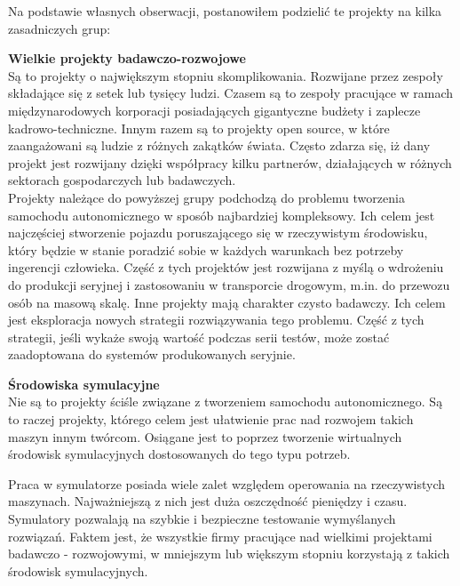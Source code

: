 Na podstawie własnych obserwacji, postanowiłem podzielić te projekty na kilka zasadniczych grup:

\begin{enumerate*}
\item \textbf{Wielkie projekty badawczo-rozwojowe} \\
Są to projekty o największym stopniu skomplikowania. Rozwijane przez zespoły składające się z setek lub tysięcy ludzi. Czasem są to zespoły pracujące w ramach międzynarodowych korporacji posiadających gigantyczne budżety i zaplecze kadrowo-techniczne. Innym razem są to projekty open source, w które zaangażowani są ludzie z różnych zakątków świata. Często zdarza się, iż dany projekt jest rozwijany dzięki współpracy kilku partnerów, działających w różnych sektorach gospodarczych lub badawczych. \\
Projekty należące do powyższej grupy podchodzą do problemu tworzenia samochodu autonomicznego w sposób najbardziej kompleksowy. Ich celem jest najczęściej stworzenie pojazdu poruszającego się w rzeczywistym środowisku, który będzie w stanie poradzić sobie w każdych warunkach bez potrzeby ingerencji człowieka.
Część z tych projektów jest rozwijana z myślą o wdrożeniu do produkcji seryjnej i zastosowaniu w transporcie drogowym, m.in. do przewozu osób na masową skalę.
Inne projekty mają charakter czysto badawczy. Ich celem jest eksploracja nowych strategii rozwiązywania tego problemu. Część z tych strategii, jeśli wykaże swoją wartość podczas serii testów, może zostać zaadoptowana do systemów produkowanych seryjnie. \\

\item \textbf{Środowiska symulacyjne} \\
Nie są to projekty ściśle związane z tworzeniem samochodu autonomicznego. Są to raczej projekty, którego celem jest ułatwienie prac nad rozwojem takich maszyn innym twórcom. Osiągane jest to poprzez tworzenie wirtualnych środowisk symulacyjnych dostosowanych do tego typu potrzeb. 

\hspace{0.5cm} Praca w symulatorze posiada wiele zalet względem operowania na rzeczywistych maszynach. Najważniejszą z nich jest duża oszczędność pieniędzy i czasu. Symulatory pozwalają na szybkie i bezpieczne testowanie wymyślanych rozwiązań. \linebreak
Faktem jest, że wszystkie firmy pracujące nad wielkimi projektami badawczo - rozwojowymi, w mniejszym lub większym stopniu korzystają z takich środowisk symulacyjnych. \\


\end{enumerate*}
